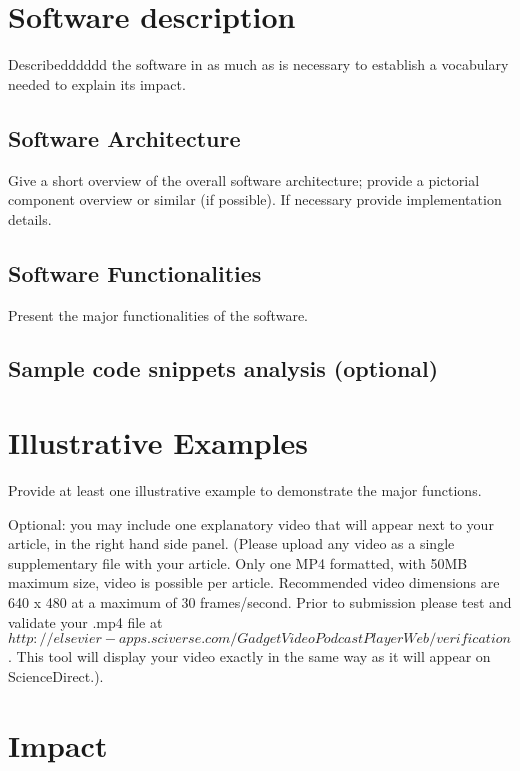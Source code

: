 \documentclass[preprint,12pt, a4paper]{elsarticle}
\begin{document}
\section{Software description}
\label{}

Describedddddd the software in as much as is necessary to establish a vocabulary needed to explain its impact.

\subsection{Software Architecture}
\label{}

Give a short overview of the overall software architecture; provide a pictorial component overview or similar (if possible). If necessary provide implementation details.

\subsection{Software Functionalities}
\label{}

Present the major functionalities of the software.

\subsection{Sample code snippets analysis (optional)}
\label{}

\section{Illustrative Examples}
\label{}

Provide at least one illustrative example to demonstrate the major functions.

Optional: you may include one explanatory video that will appear next to your article, in the right hand side panel. (Please upload any video as a single supplementary file with your article. Only one MP4 formatted, with 50MB maximum size, video is possible per article. Recommended video dimensions are 640 x 480 at a maximum of 30 frames/second. Prior to submission please test and validate your .mp4 file at $ http://elsevier-apps.sciverse.com/GadgetVideoPodcastPlayerWeb/verification$. This tool will display your video exactly in the same way as it will appear on ScienceDirect.).

\section{Impact}
\label{}
\end{document}
